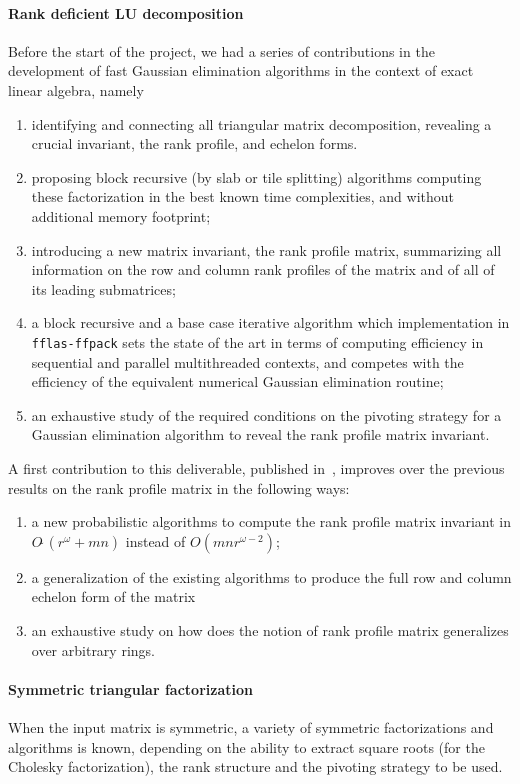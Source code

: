 \documentclass{deliverablereport}
\begin{document}
\paragraph{Rank deficient LU decomposition} Before the start of the project, we had a series of contributions in the
development of fast Gaussian elimination algorithms in the context of exact
linear algebra, namely
\begin{enumerate}
\item identifying and connecting all triangular matrix decomposition, revealing
  a crucial invariant, the rank profile, and echelon forms.
\item proposing block recursive (by slab or tile splitting) algorithms computing
  these factorization in the best known time complexities, and without
  additional memory footprint;
\item introducing a new matrix invariant, the rank profile matrix, summarizing
  all information on the row and column rank profiles of the matrix and of all
  of its leading submatrices;
\item a block recursive and a base case iterative algorithm which implementation
  in \texttt{fflas-ffpack} sets the state of the art in terms of computing
  efficiency in sequential and parallel multithreaded contexts, and competes
  with the efficiency of the equivalent numerical Gaussian elimination routine;
\item an exhaustive study of the required
conditions on the pivoting strategy for a Gaussian elimination algorithm to
reveal the rank profile matrix invariant.

\end{enumerate}
A first contribution to this deliverable, published in~\cite{DPS17},
improves over the previous results on the rank profile matrix in the following
ways:
\begin{enumerate}
\item a new probabilistic algorithms to compute the rank profile matrix
  invariant in  $O\tilde\ (r^\omega + mn)$ instead of $O(mnr^{\omega-2})$;
\item a generalization of the existing algorithms to produce the full row and
  column echelon form of the matrix
\item an exhaustive study on how does the notion of rank profile matrix
  generalizes over arbitrary rings.
\end{enumerate}


\paragraph{Symmetric triangular factorization}
When the input matrix is symmetric, a variety of symmetric factorizations and
algorithms is known, depending on the ability to extract
square roots (for the Cholesky factorization), the rank structure and the
pivoting strategy to be used.
\end{document}

